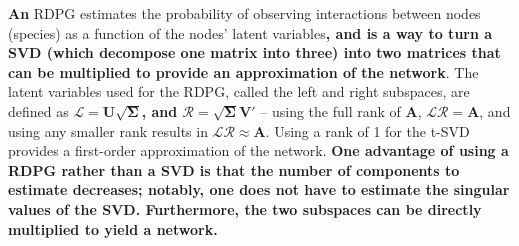\documentclass[11pt]{article}
\makeatletter
\def\maxwidth{\ifdim\Gin@nat@width>\linewidth\linewidth
\else\Gin@nat@width\fi}
\let\Oldincludegraphics\includegraphics
\renewcommand{\includegraphics}[1]{\Oldincludegraphics[width=\maxwidth]{#1}}
\providecommand{\DIFaddtex}[1]{{\bf #1}} %
\providecommand{\DIFdeltex}[1]{} %
\providecommand{\DIFaddbegin}{\protect\color{blue}} %
\providecommand{\DIFaddend}{\protect\color{black}} %
\providecommand{\DIFdelbegin}{\protect\color{red}} %
\providecommand{\DIFdelend}{\protect\color{black}} %
\providecommand{\DIFadd}[1]{\texorpdfstring{\DIFaddtex{#1}}{#1}} %
\providecommand{\DIFdel}[1]{\texorpdfstring{\DIFdeltex{#1}}{}} %
\newcommand{\DIFscaledelfig}{0.5}
\newlength{\DIFdelgraphicswidth} %
\newlength{\DIFdelgraphicsheight} %
\newcommand{\DIFaddincludegraphics}[2][]{{\color{blue}\fbox{\DIFOincludegraphics[#1]{#2}}}} %
\newcommand{\DIFdelincludegraphics}[2][]{%
\sbox{\DIFdelgraphicsbox}{\DIFOincludegraphics[#1]{#2}}%
\settoboxwidth{\DIFdelgraphicswidth}{\DIFdelgraphicsbox} %
\settoboxtotalheight{\DIFdelgraphicsheight}{\DIFdelgraphicsbox} %
\scalebox{\DIFscaledelfig}{%
\parbox[b]{\DIFdelgraphicswidth}{\usebox{\DIFdelgraphicsbox}\\[-\baselineskip] \rule{\DIFdelgraphicswidth}{0em}}\llap{\resizebox{\DIFdelgraphicswidth}{\DIFdelgraphicsheight}{%
\setlength{\unitlength}{\DIFdelgraphicswidth}%
\begin{picture}(1,1)%
\thicklines\linethickness{2pt} %
{\color[rgb]{1,0,0}\put(0,0){\framebox(1,1){}}}%
{\color[rgb]{1,0,0}\put(0,0){\line( 1,1){1}}}%
{\color[rgb]{1,0,0}\put(0,1){\line(1,-1){1}}}%
\end{picture}%
}\hspace*{3pt}}} %
} %
\DeclareRobustCommand{\DIFaddbegin}{\DIFOaddbegin \let\includegraphics\DIFaddincludegraphics} %
\DeclareRobustCommand{\DIFaddend}{\DIFOaddend \let\includegraphics\DIFOincludegraphics} %
\DeclareRobustCommand{\DIFdelbegin}{\DIFOdelbegin \let\includegraphics\DIFdelincludegraphics} %
\DeclareRobustCommand{\DIFdelend}{\DIFOaddend \let\includegraphics\DIFOincludegraphics} %
\makeatother
\begin{document}
\DIFdelbegin \DIFdel{A }\DIFdelend \DIFaddbegin \DIFadd{An }\DIFaddend RDPG estimates the probability of observing interactions between
nodes (species) as a function of the nodes' latent variables\DIFaddbegin \DIFadd{, and is a
way to turn a SVD (which decompose one matrix into three) into two
matrices that can be multiplied to provide an approximation of the
network}\DIFaddend . The latent variables used for the RDPG, called the left and
right subspaces, are defined as
\DIFdelbegin \DIFdel{\(\mathscr{L} = \mathbf{L}\sqrt{\mathbf{\Sigma}}\), and
\(\mathscr{R} = \sqrt{\mathbf{\Sigma}}\mathbf{R}\) }\DIFdelend \DIFaddbegin \DIFadd{\(\mathscr{L} = \mathbf{U}\sqrt{\mathbf{\Sigma}}\), and
\(\mathscr{R} = \sqrt{\mathbf{\Sigma}}\mathbf{V}'\) }\DIFaddend -- using the full
rank of \(\mathbf{A}\), \DIFdelbegin \DIFdel{\(\mathscr{L}\mathscr{R}' = \mathbf{A}\)}\DIFdelend \DIFaddbegin \DIFadd{\(\mathscr{L}\mathscr{R} = \mathbf{A}\)}\DIFaddend , and
using any smaller rank results in
\DIFdelbegin \DIFdel{\(\mathscr{L}\mathscr{R}' \approx \mathbf{A}\)}\DIFdelend \DIFaddbegin \DIFadd{\(\mathscr{L}\mathscr{R} \approx \mathbf{A}\)}\DIFaddend . Using a rank of 1 for the
t-SVD provides a first-order approximation of the network. \DIFaddbegin \DIFadd{One advantage
of using a RDPG rather than a SVD is that the number of components to
estimate decreases; notably, one does not have to estimate the singular
values of the SVD. Furthermore, the two subspaces can be directly
multiplied to yield a network.
}\DIFaddend 
\end{document}
